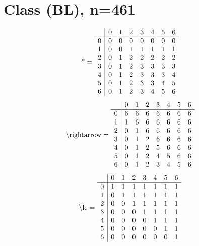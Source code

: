 \documentclass[11pt]{article}
\begin{document}
\section{Class (BL), n=461}
\[\text{*} = 
\begin{array}{r | r r r r r r r}
 & 0 & 1 & 2 & 3 & 4 & 5 & 6 \\ \hline
0 & 0 & 0 & 0 & 0 & 0 & 0 & 0 \\
1 & 0 & 0 & 1 & 1 & 1 & 1 & 1 \\
2 & 0 & 1 & 2 & 2 & 2 & 2 & 2 \\
3 & 0 & 1 & 2 & 3 & 3 & 3 & 3 \\
4 & 0 & 1 & 2 & 3 & 3 & 3 & 4 \\
5 & 0 & 1 & 2 & 3 & 3 & 4 & 5 \\
6 & 0 & 1 & 2 & 3 & 4 & 5 & 6 \\
\end{array}
\]
\[\text{\textbackslash rightarrow} = 
\begin{array}{r | r r r r r r r}
 & 0 & 1 & 2 & 3 & 4 & 5 & 6 \\ \hline
0 & 6 & 6 & 6 & 6 & 6 & 6 & 6 \\
1 & 1 & 6 & 6 & 6 & 6 & 6 & 6 \\
2 & 0 & 1 & 6 & 6 & 6 & 6 & 6 \\
3 & 0 & 1 & 2 & 6 & 6 & 6 & 6 \\
4 & 0 & 1 & 2 & 5 & 6 & 6 & 6 \\
5 & 0 & 1 & 2 & 4 & 5 & 6 & 6 \\
6 & 0 & 1 & 2 & 3 & 4 & 5 & 6 \\
\end{array}
\]
\[\text{\textbackslash le} = 
\begin{array}{r | r r r r r r r}
 & 0 & 1 & 2 & 3 & 4 & 5 & 6 \\ \hline
0 & 1 & 1 & 1 & 1 & 1 & 1 & 1 \\
1 & 0 & 1 & 1 & 1 & 1 & 1 & 1 \\
2 & 0 & 0 & 1 & 1 & 1 & 1 & 1 \\
3 & 0 & 0 & 0 & 1 & 1 & 1 & 1 \\
4 & 0 & 0 & 0 & 0 & 1 & 1 & 1 \\
5 & 0 & 0 & 0 & 0 & 0 & 1 & 1 \\
6 & 0 & 0 & 0 & 0 & 0 & 0 & 1 \\
\end{array}
\]
\end{document}
